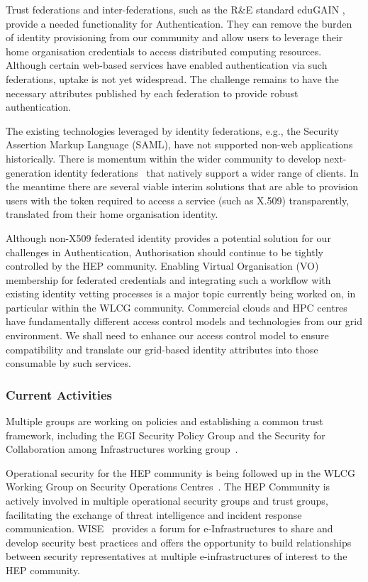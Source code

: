 Trust federations and inter-federations, such as the R\&E standard
eduGAIN \cite{eduGAIN}, provide a needed functionality for
Authentication. They can remove the burden of identity provisioning from
our community and allow users to leverage their home organisation
credentials to access distributed computing resources. Although certain
web-based services have enabled authentication via such federations,
uptake is not yet widespread. The challenge remains to have the
necessary attributes published by each federation to provide robust
authentication.

The existing technologies leveraged by identity federations, e.g., the
Security Assertion Markup Language (SAML), have not supported non-web
applications historically. There is momentum within the wider community
to develop next-generation identity federations~\cite{OICFederation}
that natively support a
wider range of clients. In the meantime there are several viable interim
solutions that are able to provision users with the token required to
access a service (such as X.509) transparently, translated from their
home organisation identity.

Although non-X509 federated identity provides a potential solution for our
challenges in Authentication, Authorisation should continue to be
tightly controlled by the HEP community. Enabling Virtual Organisation
(VO) membership for federated credentials and integrating such a
workflow with existing identity vetting processes is a major topic
currently being worked on, in particular within the WLCG community.
Commercial clouds and HPC centres have fundamentally different access
control models and technologies from our grid environment. We shall need
to enhance our access control model to ensure compatibility and
translate our grid-based identity attributes into those consumable by
such services.

\subsubsection*{Current Activities}

Multiple groups are working on policies and establishing a common trust
framework, including the EGI Security Policy Group
\cite{EGISecurityPolicyGroup} and the Security for Collaboration among
Infrastructures working group~\cite{SCI_WG}.

Operational security for the HEP community is being followed up in the
WLCG Working Group on Security Operations Centres~\cite{WLCG-SOC-WG}. The
HEP Community is actively involved in multiple operational security
groups and trust groups, facilitating the exchange of threat
intelligence and incident response communication. WISE~\cite{WISE}
provides a forum for e-Infrastructures to share and develop security
best practices and offers the opportunity to build relationships between
security representatives at multiple e-infrastructures of interest to
the HEP community.

